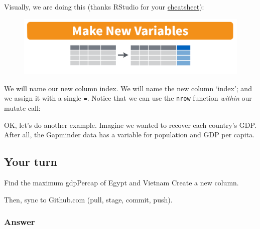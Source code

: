 \documentclass[]{book}
\newenvironment{Shaded}{\begin{snugshade}}{\end{snugshade}}
\newcommand{\KeywordTok}[1]{\textcolor[rgb]{0.13,0.29,0.53}{\textbf{#1}}}
\newcommand{\DataTypeTok}[1]{\textcolor[rgb]{0.13,0.29,0.53}{#1}}
\newcommand{\DecValTok}[1]{\textcolor[rgb]{0.00,0.00,0.81}{#1}}
\newcommand{\StringTok}[1]{\textcolor[rgb]{0.31,0.60,0.02}{#1}}
\newcommand{\OperatorTok}[1]{\textcolor[rgb]{0.81,0.36,0.00}{\textbf{#1}}}
\newcommand{\NormalTok}[1]{#1}
\theoremstyle{definition}
\theoremstyle{definition}
\theoremstyle{definition}
\theoremstyle{remark}
\begin{document}
Visually, we are doing this (thanks RStudio for your
\href{http://www.rstudio.com/wp-content/uploads/2015/02/data-wrangling-cheatsheet.pdf}{cheatsheet}):

\begin{figure}
\centering
\includegraphics{img/rstudio-cheatsheet-mutate.png}
\caption{}
\end{figure}

We will name our new column index. We will name the new column `index';
and we assign it with a single \texttt{=}. Notice that we can use the
\texttt{nrow} function \emph{within} our mutate call:

\begin{Shaded}
\end{Shaded}

OK, let's do another example. Imagine we wanted to recover each
country's GDP. After all, the Gapminder data has a variable for
population and GDP per capita.

\begin{Shaded}
\end{Shaded}

\subsection{Your turn}\label{your-turn-6}

Find the maximum gdpPercap of Egypt and Vietnam Create a new column.

Then, sync to Github.com (pull, stage, commit, push).

\subsubsection{Answer}\label{answer-1}
\end{document}
